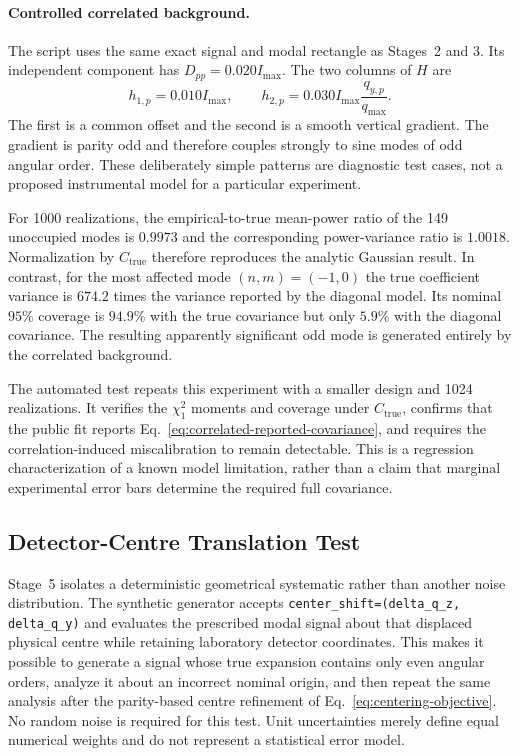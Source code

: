 \documentclass[aps,prb,preprint,onecolumn,notitlepage,amsmath,amssymb,
  superscriptaddress,floatfix]{revtex4-2}
\begin{document}
\paragraph{Controlled correlated background.}
The script  uses the same
exact signal and modal rectangle as Stages~2 and 3.  Its independent component
has $D_{pp}=0.020I_{\max}$.  The two columns of $H$ are
\begin{equation}
 h_{1,p}=0.010I_{\max},
 \qquad
 h_{2,p}=0.030I_{\max}\frac{q_{y,p}}{q_{\max}}.
 \label{eq:correlated-patterns}
\end{equation}
The first is a common offset and the second is a smooth vertical gradient.
The gradient is parity odd and therefore couples strongly to sine modes of odd
angular order.  These deliberately simple patterns are diagnostic test cases,
not a proposed instrumental model for a particular experiment.

For 1000 realizations, the empirical-to-true mean-power ratio of the 149
unoccupied modes is $0.9973$ and the corresponding power-variance ratio is
$1.0018$.  Normalization by $C_{\mathrm{true}}$ therefore reproduces the
analytic Gaussian result.  In contrast, for the most affected mode
$(n,m)=(-1,0)$ the true coefficient variance is $674.2$ times the variance
reported by the diagonal model.  Its nominal $95\%$ coverage is $94.9\%$ with
the true covariance but only $5.9\%$ with the diagonal covariance.  The
resulting apparently significant odd mode is generated entirely by the
correlated background.

The automated test  repeats this
experiment with a smaller design and 1024 realizations.  It verifies the
$\chi_1^2$ moments and coverage under $C_{\mathrm{true}}$, confirms that the
public fit reports Eq.~\eqref{eq:correlated-reported-covariance}, and requires
the correlation-induced miscalibration to remain detectable.  This is a
regression characterization of a known model limitation, rather than a claim
that marginal experimental error bars determine the required full covariance.

\subsection{Detector-Centre Translation Test}

Stage~5 isolates a deterministic geometrical systematic rather than another
noise distribution.  The synthetic generator accepts
\texttt{center\_shift=(delta\_q\_z, delta\_q\_y)} and evaluates the prescribed
modal signal about that displaced physical centre while retaining laboratory
detector coordinates.  This makes it possible to generate a signal whose
true expansion contains only even angular orders, analyze it about an
incorrect nominal origin, and then repeat the same analysis after the
parity-based centre refinement of Eq.~\eqref{eq:centering-objective}.  No
random noise is required for this test.  Unit uncertainties merely define
equal numerical weights and do not represent a statistical error model.
\end{document}
